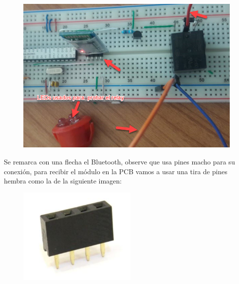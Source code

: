 \documentclass[12pt]{article}
\begin{document}
\begin{figure}[H]
	\begin{Center}
		\includegraphics[width=4.48in,height=3.1in]{./media/image18.jpeg}
	\end{Center}
\end{figure}



\par

Se remarca con una flecha el Bluetooth, observe que usa pines macho para su conexión, para recibir el módulo en la PCB vamos a usar una tira de pines hembra como la de la siguiente imagen:\par




\begin{figure}[H]
	\begin{Center}
		\includegraphics[width=2.29in,height=1.86in]{./media/image19.jpeg}
	\end{Center}
\end{figure}


\end{document}
